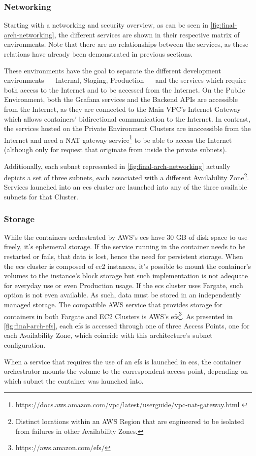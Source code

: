 \subsubsection{Networking}\label{methodology:sss:final-networking}


Starting with a networking and security overview, as can be seen in \cref{fig:final-arch-networking}, the different services are shown in their respective matrix of environments. 
Note that there are no relationships between the services, as these relations have already been demonstrated in previous sections.
 
These environments have the goal to separate the different development environments --- Internal, Staging, Production --- and the services which require both access to the Internet and to be accessed from the Internet. On the Public Environment, both the Grafana services and the Backend APIs are accessible from the Internet, as they are connected to the Main VPC's Internet Gateway which allows containers' bidirectional communication to the Internet. In contrast, the services hosted on the Private Environment Clusters are inaccessible from the Internet and need a NAT gateway service\footnote{https://docs.aws.amazon.com/vpc/latest/userguide/vpc-nat-gateway.html \label{foot:nat-gateway}} to be able to access the Internet (although only for request that originate from inside the private subnets).

Additionally, each subnet represented in \cref{fig:final-arch-networking} actually depicts a set of three subnets, each associated with a different Availability Zone\footnote{Distinct locations within an AWS Region that are engineered to be isolated from failures in other Availability Zones.\label{foot:aws-availability-zones}}. Services launched into an \gls{ecs} cluster are launched into any of the three available subnets for that Cluster.


\subsubsection{Storage}\label{methodology:sss:final-storage}


While the containers orchestrated by AWS's \gls{ecs} have 30 GB of disk space to use freely, it's ephemeral storage. If the service running in the container needs to be restarted or fails, that data is lost, hence the need for persistent storage. 
When the \gls{ecs} cluster is composed of \gls{ec2} instances, it's possible to mount the container's volumes to the instance's block storage but such implementation is not adequate for everyday use or even Production usage. If the \gls{ecs} cluster uses Fargate, such option is not even available. As such, data must be stored in an independently managed storage. The compatible AWS service that provides storage for containers in both Fargate and EC2 Clusters is AWS's \gls{efs}\footnote{https://aws.amazon.com/efs/\label{foot:efs}}.
As presented in \cref{fig:final-arch-efs}, each \gls{efs} is accessed through one of three Access Points, one for each Availability Zone, which coincide with this architecture's subnet configuration.


When a service that requires the use of an \gls{efs} is launched in \gls{ecs}, the container orchestrator mounts the volume to the correspondent access point, depending on which subnet the container was launched into.